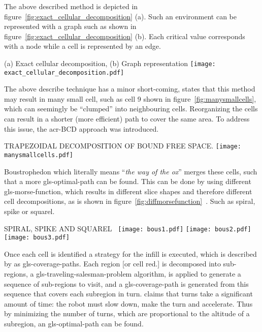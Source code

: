 The above described method is depicted in figure~\ref{fig:exact_cellular_decomposition} (a). Such an environment can be
represented with a graph such as shown in figure~\ref{fig:exact_cellular_decomposition} (b). Each critical value
corresponds with a node while a cell is represented by an edge.

\begin{RoyalFigure}[!htb, label=fig:exact_cellular_decomposition]{(a) Exact cellular decomposition, (b) Graph 
representation}
    \texttt{[image: exact\_cellular\_decomposition.pdf]}
\end{RoyalFigure}

The above describe technique has a minor short-coming, \citet{choset_exact_2000} states that this method may result in
many small cell, such as cell 9 shown in figure~\ref{fig:manysmallcells}, which can seemingly be ``clumped'' into
neighbouring cells. Reorganizing the cells can result in a shorter (more efficient) path to cover the same area. To
address this issue, the \gls{acr-BCD} approach was introduced.

\begin{RoyalFigure}[!htb, label=fig:manysmallcells]{TRAPEZOIDAL DECOMPOSITION OF BOUND FREE 
SPACE\cite{choset_exact_2000}.}
    \texttt{[image: manysmallcells.pdf]}
\end{RoyalFigure}

Boustrophedon which literally means ``\emph{the way of the ox}'' merges these cells, such that a more
\gls{gls-optimal-path} can be found. This can be done by using different \gls{gls-morse-function}, which results in
different slice shapes and therefore different cell decompositions, as is shown in
figure~\ref{fig:diffmorsefunction}~\cite{galceran_survey_2013}\cite{choset_coverage_2000}\cite{acar_morse_2002}. Such as
spiral, spike or squarel.

\begin{RoyalFigure}[!htb, label=fig:diffmorsefunction]{SPIRAL, SPIKE AND SQUAREL~\cite{acar_morse_2002}}
    \texttt{[image: bous1.pdf]}
    \texttt{[image: bous2.pdf]}
    \texttt{[image: bous3.pdf]}
\end{RoyalFigure}

Once each cell is identified a strategy for the infill is executed, which is described by \citet{huang_optimal_2001} as
\gls{gls-coverage-path}s. Each region [or cell red.] is decomposed into sub-regions, a
\gls{gls-traveling-salesman-problem} algorithm, is applied to generate a sequence of sub-regions to visit, and a
\gls{gls-coverage-path} is generated from this sequence that covers each subregion in turn. \citet{huang_optimal_2001}
claims that turns take a significant amount of time: the robot must slow down, make the turn and accelerate. Thus by
minimizing the number of turns, which are proportional to the altitude of a subregion, an \gls{gls-optimal-path} can be
found.

